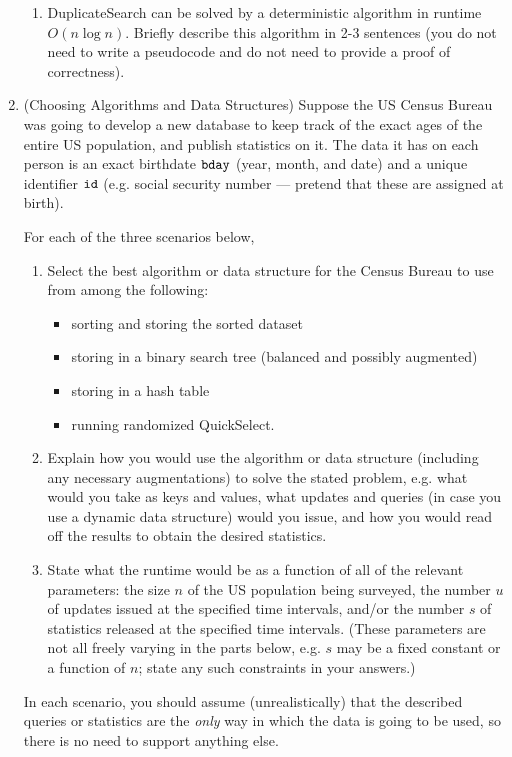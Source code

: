 \documentclass[11pt]{article}
\begin{document}
\begin{enumerate}
\begin{enumerate}
    \item DuplicateSearch can be solved by a deterministic algorithm in runtime $O(n\log n)$. Briefly describe this algorithm in 2-3 sentences (you do not need to write a pseudocode and do not need to provide a proof of correctness).

\end{enumerate}    
    

 \item (Choosing Algorithms and Data Structures)
     Suppose the US Census Bureau was going to develop a new database to keep track of the exact ages of the entire US population, and publish statistics on it.  The data it has on each person is an exact birthdate
    $\texttt{bday}$ (year, month, and date) and a unique identifier $\texttt{id}$ (e.g. social security number --- pretend that these are assigned at birth). 
    
    For each of the three scenarios below, 
    \begin{enumerate}
        \item Select the best algorithm or data structure for the Census Bureau to use from among the following: 
        \begin{itemize}
            \item sorting and storing the sorted dataset 
            \item storing in a binary search tree (balanced and possibly augmented)
            \item storing in a hash table
            \item running randomized QuickSelect. 
        \end{itemize}
        \item Explain how you would use the
        algorithm or data structure (including any necessary augmentations) to solve the stated problem, e.g. what would you take as keys and values, what updates and queries (in case you use a dynamic data structure) would you issue, and how you would read off the results to obtain the desired statistics. 
        \item State what the runtime would be as a function of all of the relevant parameters: the size $n$ of the US population being surveyed, the number $u$ of updates issued at the specified time intervals, and/or the number $s$ of statistics released at the specified time intervals.     (These parameters are not all freely varying in the parts below, e.g. $s$ may be a fixed constant or a function of $n$; state any such constraints in your answers.) 
    \end{enumerate}
    In each scenario, you should assume (unrealistically) that the described queries or statistics are the {\em only} way in which the data is going to be used, so there is no need to support anything else.
        

\end{enumerate}
\end{document}
